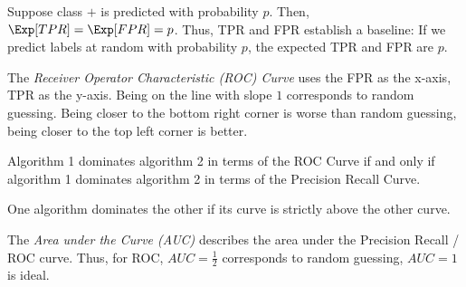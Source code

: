 Suppose class $+$ is predicted with probability $p$.
Then, $\Exp[TPR] = \Exp[FPR] = p$.
Thus, TPR and FPR establish a baseline:
If we predict labels at random with probability $p$,
the expected TPR and FPR are $p$.

The \emph{Receiver Operator Characteristic (ROC) Curve}
uses the FPR as the x-axis, TPR as the y-axis.
Being on the line with slope $1$ corresponds to random
guessing. Being closer to the bottom right corner is worse
than random guessing, being closer to the top left corner
is better.

\begin{theorem}
    Algorithm 1 dominates algorithm 2 in terms of the
    ROC Curve if and only if
    algorithm 1 dominates algorithm 2 in terms of the
    Precision Recall Curve.
    
    One algorithm dominates the other if its curve
    is strictly above the other curve.
\end{theorem}

The \emph{Area under the Curve (AUC)} describes the
area under the Precision Recall / ROC curve.
Thus, for ROC, $AUC = \frac{1}{2}$ corresponds to random
guessing, $AUC = 1$ is ideal.
